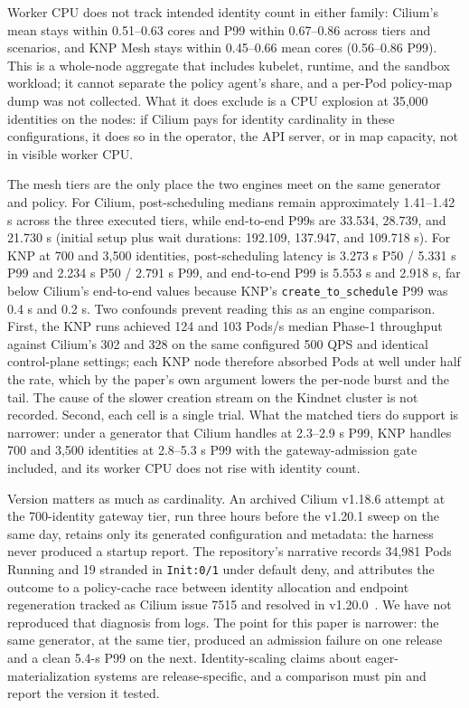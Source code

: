 \documentclass[letterpaper,twocolumn,10pt]{article}
\newcommand{\sys}{\textsc{KNP}}
\begin{document}
Worker CPU does not track intended identity count in either family:
Cilium's mean stays within 0.51--0.63 cores and P99 within 0.67--0.86
across tiers and scenarios, and \sys{} Mesh stays within 0.45--0.66 mean
cores (0.56--0.86 P99). This is a whole-node aggregate that includes kubelet,
runtime, and the sandbox workload; it cannot separate the policy agent's share,
and a per-Pod policy-map dump was not collected. What it does exclude
is a CPU explosion at 35,000 identities on the nodes: if Cilium pays
for identity cardinality in these configurations, it does so in the
operator, the API server, or in map capacity, not in visible worker CPU.

The mesh tiers are the only place the two engines meet on the same
generator and policy. For Cilium, post-scheduling medians remain
approximately 1.41--1.42 s across the three executed tiers, while
end-to-end P99s are 33.534, 28.739, and 21.730 s (initial setup plus wait
durations: 192.109, 137.947, and 109.718 s). For \sys{} at 700 and 3,500
identities, post-scheduling latency is 3.273 s P50 / 5.331 s P99 and
2.234 s P50 / 2.791 s P99, and end-to-end P99 is 5.553 s and 2.918 s,
far below Cilium's end-to-end values because \sys{}'s
\texttt{create\_to\_schedule} P99 was 0.4 s and 0.2 s. Two confounds
prevent reading this as an engine comparison. First, the \sys{} runs
achieved 124 and 103 Pods/s median Phase-1 throughput against Cilium's
302 and 328 on the same configured 500 QPS and identical control-plane
settings; each \sys{} node therefore absorbed Pods at well under half
the rate, which by the paper's own argument lowers the per-node burst
and the tail. The cause of the slower creation stream on the Kindnet
cluster is not recorded. Second, each cell is a single trial. What the
matched tiers do support is narrower: under a generator that Cilium
handles at 2.3--2.9 s P99, \sys{} handles 700 and 3,500 identities at
2.8--5.3 s P99 with the gateway-admission gate included, and its worker
CPU does not rise with identity count.

Version matters as much as cardinality. An archived Cilium v1.18.6
attempt at the 700-identity gateway tier, run three hours before the
v1.20.1 sweep on the same day, retains only its generated configuration
and metadata: the harness never produced a startup report. The repository's narrative
records 34,981 Pods Running and 19 stranded in \texttt{Init:0/1} under
default deny, and attributes the outcome to a policy-cache race between
identity allocation and endpoint regeneration tracked as Cilium issue
7515 and resolved in v1.20.0~\cite{cilium7515}. We have not reproduced
that diagnosis from logs. The point for this paper is narrower: the
same generator, at the same tier, produced an admission failure on one
release and a clean 5.4-s P99 on the next. Identity-scaling claims
about eager-materialization systems are release-specific, and a
comparison must pin and report the version it tested.
\end{document}

